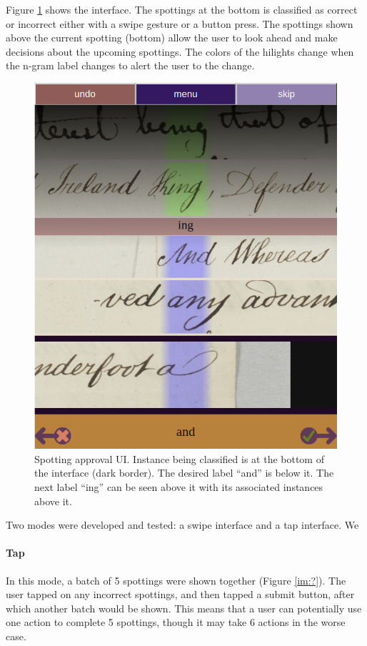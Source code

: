 \documentclass[ms,electronic,twosidetoc,letterpaper,chaptercenter,parttop,lof,lot]{byumsphd}
\begin{document}
Figure \ref{fig:spottingapproval} shows the interface. The spottings at the bottom is classified as correct or incorrect either with a swipe gesture or a button press. The spottings shown above the current spotting (bottom) allow the user to look ahead and make decisions about the upcoming spottings. The colors of the hilights change when the n-gram label changes to alert the user to the change.

\begin{figure}
    \centering
    \includegraphics[width=.75\textwidth]{spottingapproval}
    \caption{Spotting approval UI. Instance being classified is at the bottom of the interface (dark border). The desired label ``and'' is below it. The next label ``ing'' can be seen above it with its associated instances above it.
    }
    \label{fig:spottingapproval}
\end{figure}

\iffalse
Two modes were developed and tested: a swipe interface and a tap interface. We

\paragraph{Tap}
In this mode, a batch of 5 spottings were shown together (Figure \ref{im:?}). The user tapped on any incorrect spottings, and then tapped a submit button, after which another batch would be shown. This means that a user can potentially use one action to complete 5 spottings, though it may take 6 actions in the worse case.
\end{document}
